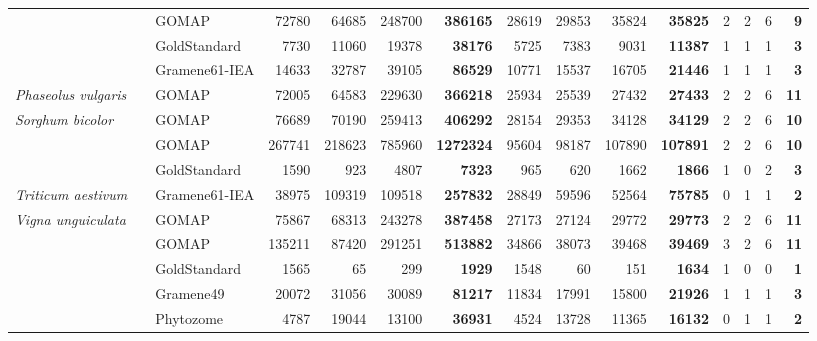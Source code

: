 \documentclass[utf8]{frontiersSCNS}
\begin{document}
\begin{table}[t]
{\begin{threeparttable}
\begin{tabular}{lrlrrr>{\bfseries}r|rrr>{\bfseries}r|rrr>{\bfseries}r}
\rowcolor{gray!6}   &  & GOMAP & 72780 & 64685 & 248700 & 386165 & 28619 & 29853 & 35824 & 35825 & 2 & 2 & 6 & 9\\

 &  & GoldStandard & 7730 & 11060 & 19378 & 38176 & 5725 & 7383 & 9031 & 11387 & 1 & 1 & 1 & 3\\

\rowcolor{gray!6}  \multirow{-3}{*}{\raggedright\arraybackslash \textit{Oryza sativa}} &  & Gramene61-IEA & 14633 & 32787 & 39105 & 86529 & 10771 & 15537 & 16705 & 21446 & 1 & 1 & 1 & 3\\

\textit{Phaseolus vulgaris} &  & GOMAP & 72005 & 64583 & 229630 & 366218 & 25934 & 25539 & 27432 & 27433 & 2 & 2 & 6 & 11\\

\rowcolor{gray!6}  \textit{Sorghum bicolor} &  & GOMAP & 76689 & 70190 & 259413 & 406292 & 28154 & 29353 & 34128 & 34129 & 2 & 2 & 6 & 10\\

 &  & GOMAP & 267741 & 218623 & 785960 & 1272324 & 95604 & 98187 & 107890 & 107891 & 2 & 2 & 6 & 10\\

\rowcolor{gray!6}   &  & GoldStandard & 1590 & 923 & 4807 & 7323 & 965 & 620 & 1662 & 1866 & 1 & 0 & 2 & 3\\

\multirow{-3}{*}{\raggedright\arraybackslash \textit{Triticum aestivum}} &  & Gramene61-IEA & 38975 & 109319 & 109518 & 257832 & 28849 & 59596 & 52564 & 75785 & 0 & 1 & 1 & 2\\

\rowcolor{gray!6}  \textit{Vigna unguiculata} &  & GOMAP & 75867 & 68313 & 243278 & 387458 & 27173 & 27124 & 29772 & 29773 & 2 & 2 & 6 & 11\\

 &  & GOMAP & 135211 & 87420 & 291251 & 513882 & 34866 & 38073 & 39468 & 39469 & 3 & 2 & 6 & 11\\

\rowcolor{gray!6}   &  & GoldStandard & 1565 & 65 & 299 & 1929 & 1548 & 60 & 151 & 1634 & 1 & 0 & 0 & 1\\

 &  & Gramene49 & 20072 & 31056 & 30089 & 81217 & 11834 & 17991 & 15800 & 21926 & 1 & 1 & 1 & 3\\

\rowcolor{gray!6}  \multirow{-4}{*}{\raggedright\arraybackslash \textit{Zea mays} B73.v3} &  & Phytozome & 4787 & 19044 & 13100 & 36931 & 4524 & 13728 & 11365 & 16132 & 0 & 1 & 1 & 2\\


\end{tabular}
\end{threeparttable}}
\end{table}
\end{document}
